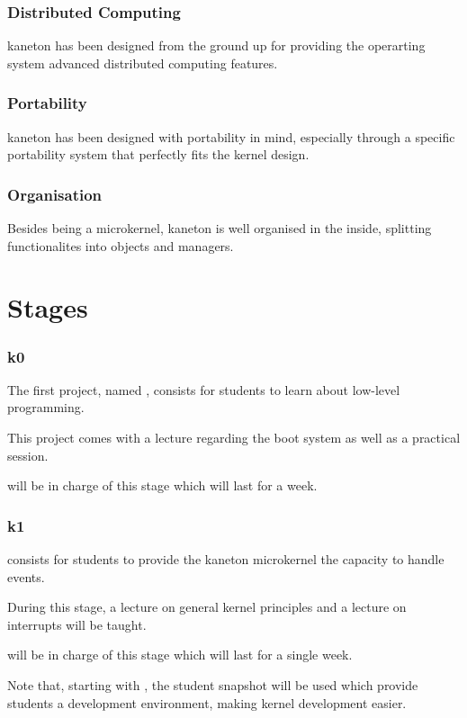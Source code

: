 
\begin{frame}
  \frametitle{Distributed Computing}

  kaneton has been designed from the ground up for providing the operarting
  system advanced distributed computing features.
\end{frame}


\begin{frame}
  \frametitle{Portability}

  kaneton has been designed with portability in mind, especially through
  a specific portability system that perfectly fits the kernel design.
\end{frame}


\begin{frame}
  \frametitle{Organisation}

  Besides being a microkernel, kaneton is well organised in the inside,
  splitting functionalites into objects and managers.
\end{frame}

%
%

\section{Stages}


\begin{frame}
  \frametitle{k0}

  The first project, named , consists for students to learn
  about low-level programming.

  \-

  This project comes with a lecture regarding the boot system as well
  as a practical session.

  \-

   will be in charge of this stage which will last for
  a week.
\end{frame}


\begin{frame}
  \frametitle{k1}

   consists for students to provide the kaneton microkernel the
  capacity to handle events.

  \-

  During this stage, a lecture on general kernel principles and a lecture on
  interrupts will be taught.

  \-

   will be in charge of this stage which will last
  for a single week.

  \-

  Note that, starting with , the student snapshot will be used which
  provide students a development environment, making kernel development easier.
\end{frame}

